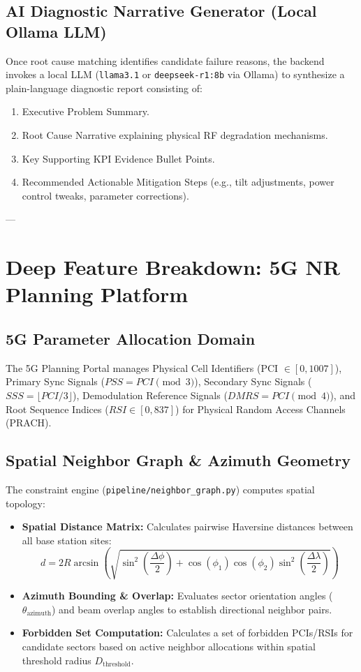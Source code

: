 \documentclass[12pt,a4paper]{report}
\begin{document}
\subsection{AI Diagnostic Narrative Generator (Local Ollama LLM)}
Once root cause matching identifies candidate failure reasons, the backend invokes a local LLM (\texttt{llama3.1} or \texttt{deepseek-r1:8b} via Ollama) to synthesize a plain-language diagnostic report consisting of:
\begin{enumerate}
    \item Executive Problem Summary.
    \item Root Cause Narrative explaining physical RF degradation mechanisms.
    \item Key Supporting KPI Evidence Bullet Points.
    \item Recommended Actionable Mitigation Steps (e.g., tilt adjustments, power control tweaks, parameter corrections).
\end{enumerate}

---

\section{Deep Feature Breakdown: 5G NR Planning Platform}

\subsection{5G Parameter Allocation Domain}
The 5G Planning Portal manages Physical Cell Identifiers (PCI $\in [0, 1007]$), Primary Sync Signals ($PSS = PCI \pmod 3$), Secondary Sync Signals ($SSS = \lfloor PCI / 3 \rfloor$), Demodulation Reference Signals ($DMRS = PCI \pmod 4$), and Root Sequence Indices ($RSI \in [0, 837]$) for Physical Random Access Channels (PRACH).

\subsection{Spatial Neighbor Graph \& Azimuth Geometry}
The constraint engine (\texttt{pipeline/neighbor_graph.py}) computes spatial topology:
\begin{itemize}
    \item \textbf{Spatial Distance Matrix:} Calculates pairwise Haversine distances between all base station sites:
    \begin{equation}
    d = 2R \arcsin \left( \sqrt{\sin^2\left(\frac{\Delta \phi}{2}\right) + \cos(\phi_1)\cos(\phi_2)\sin^2\left(\frac{\Delta \lambda}{2}\right)} \right)
    \end{equation}
    \item \textbf{Azimuth Bounding \& Overlap:} Evaluates sector orientation angles ($\theta_{\text{azimuth}}$) and beam overlap angles to establish directional neighbor pairs.
    \item \textbf{Forbidden Set Computation:} Calculates a set of forbidden PCIs/RSIs for candidate sectors based on active neighbor allocations within spatial threshold radius $D_{\text{threshold}}$.
\end{itemize}
\end{document}
